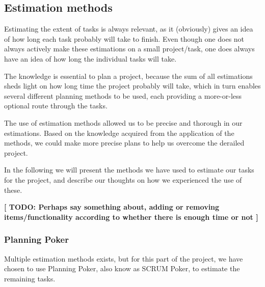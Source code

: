 \subsection{Estimation methods}
Estimating the extent of tasks is always relevant, as it (obviously) gives an idea of how long each task probably will take to finish. Even though one does not always actively make these estimations on a small project/task, one does always have an idea of how long the individual tasks will take.

The knowledge is essential to plan a project, because the sum of all estimations sheds light on how long time the project probably will take, which in turn enables several different planning methods to be used, each providing a more-or-less optional route through the tasks.

The use of estimation methods allowed us to be precise and thorough in our estimations. Based on the knowledge acquired from the application of the methods, we could make more precise plans to help us overcome the derailed project.

In the following we will present the methods we have used to estimate our tasks for the project, and describe our thoughts on how we experienced the use of these.

\textbf{ [ TODO: Perhaps say something about, adding or removing items/functionality according to whether there is enough time or not ]}

\subsubsection{Planning Poker}
Multiple estimation methods exists, but for this part of the project, we have chosen to use Planning Poker, also know as SCRUM Poker, to estimate the remaining tasks.

